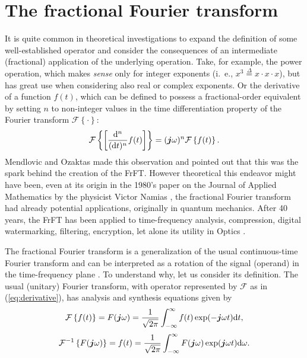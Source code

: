 \section{The fractional Fourier transform}

It is quite common in theoretical investigations to expand the definition of some well-established operator and consider the consequences of an intermediate (fractional) application of the underlying operation. Take, for example, the power operation, which makes \textit{sense} only for integer exponents (i.~e., $x^3 \overset{\Delta}{=} x \cdot x \cdot x$), but has great use when considering also real or complex exponents. Or the derivative of a function $f(t)$, which can be defined to possess a fractional-order equivalent by setting $n$ to non-integer values in the time differentiation property of the Fourier transform $\mathcal{F} \left\{ \cdot \right\}$:
\begin{equation}
\label{eq:derivative}
\mathcal{F} \left\{ \left[ \frac{\mathrm{d}^n}{(\mathrm{d}t)^n} f(t) \right] \right\} =
(\boldsymbol{j} \omega)^n \mathcal{F} \left\{ f(t) \right\}.
\end{equation}
Mendlovic and Ozaktas made this observation \cite{mendlovic1993fractionalI} and pointed out that this was the spark behind the creation of the FrFT. However theoretical this endeavor might have been, even at its origin in the 1980's paper on the Journal of Applied Mathematics by the physicist Victor Namias \cite{namias1980fractional}, the fractional Fourier transform had already potential applications, originally in quantum mechanics. After 40 years, the FrFT has been applied to time-frequency analysis, compression, digital watermarking, filtering, encryption, let alone its utility in Optics \cite{bultheel2002shattered,figueiredo2018}.

The fractional Fourier transform is a generalization of the usual continuous-time Fourier transform and can be interpreted as a rotation of the signal (operand) in the time-frequency plane \cite{almeida1994fractional}. To understand why, let us consider its definition. The usual (unitary) Fourier transform, with operator represented by $\mathcal{F}$ as in (\ref{eq:derivative}), has analysis and synthesis equations given by
\begin{equation}
\mathcal{F}\left\{ f(t) \right\} = F(\boldsymbol{j} \omega) = \frac{1}{\sqrt{2 \pi}} \int_{-\infty}^{\infty} f(t) \exp(-\boldsymbol{j} \omega t) \mathrm{d}t,
\end{equation}
\begin{equation}
\mathcal{F}^{-1}\left\{ F(\boldsymbol{j} \omega) \right\} = f(t) = \frac{1}{\sqrt{2 \pi}} \int_{-\infty}^{\infty} F(\boldsymbol{j} \omega) \exp(\boldsymbol{j} \omega t) \mathrm{d}\omega.
\end{equation}

